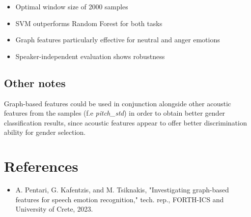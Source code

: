 \documentclass{article}
\begin{document}
\begin{itemize}
    \item Optimal window size of 2000 samples
    \item SVM outperforms Random Forest for both tasks
    \item Graph features particularly effective for neutral and anger emotions
    \item Speaker-independent evaluation shows robustness
\end{itemize}

\subsection{Other notes}

Graph-based features could be used in conjunction alongside other acoustic features from the samples (f.e \textit{pitch\_std}) in order to obtain
better gender classification results, since acoustic features appear to offer better discrimination ability for gender selection.
\newpage
\section{References}
\begin{itemize}
    \item A. Pentari, G. Kafentzis, and M. Tsiknakis, "Investigating graph-based features for speech emotion recognition," tech. rep., FORTH-ICS and University of Crete, 2023.
\end{itemize}
\end{document}
